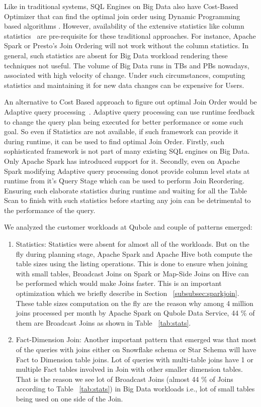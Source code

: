 \documentclass[conference]{IEEEtran}
\begin{document}
Like in traditional systems, SQL Engines on Big Data also have Cost-Based Optimizer that can find the optimal join order using Dynamic Programming based algorithms \cite{b1}. However, availability of the extensive statistics like column statistics~\cite{b11} are pre-requisite for these traditional approaches. For instance, Apache Spark or Presto's Join Ordering will not work without the column statistics. In general, such statistics are absent for Big Data workload rendering these techniques not useful. The volume of Big Data runs in TBs and PBs nowadays, associated with high velocity of change. Under such circumstances, computing statistics and maintaining it for new data changes can be expensive for Users.

An alternative to Cost Based approach to figure out optimal Join Order would be Adaptive query processing~\cite{b12}. Adaptive query processing can use runtime feedback to change the query plan being executed for better performance or some such goal. So even if Statistics are not available, if such framework can provide it during runtime, it can be used to find optimal Join Order.
Firstly, such sophisticated framework is not part of many existing SQL engines on Big Data. Only Apache Spark has introduced support for it.  Secondly,  
even on Apache Spark modifying Adaptive query processing  donot provide column level stats at runtime from it's Query Stage which can be used to perform Join Reordering. Ensuring such elaborate statistics during runtime and waiting for all the Table Scan to finish with such statistics before starting any join can be detrimental to the performance of the query.

We analyzed the customer workloads at Qubole and couple of patterns emerged:
\begin{enumerate}
\item Statistics: Statistics were absent for almost all of the workloads. But on the fly during planning stage, Apache Spark and Apache Hive both compute the table sizes using the listing operations. This is done to ensure when joining with small tables, Broadcast Joins on Spark or Map-Side Joins on Hive can be performed which would make Joins faster. This is an important optimization which we briefly describe in Section ~\ref{subsubsec:sparkjoin}. These table sizes computation on the fly are the reason why among 4 million joins processed per month by Apache Spark on Qubole Data Service, 44 \% of them are Broadcast Joins as shown in Table ~\ref{tab:stats}.
\item Fact-Dimension Join: Another important pattern that emerged was that most of the queries with joins either on Snowflake schema or Star Schema will have Fact to Dimension table joins. Lot of queries with multi-table joins have 1 or multiple Fact tables involved in Join with other smaller dimension tables. That is the reason we see lot of Broadcast Joins (almost 44 \% of Joins according to Table ~\ref{tab:stats}) in Big Data workloads i.e., lot of small tables being used on one side of the Join.
\end{enumerate}
\end{document}
